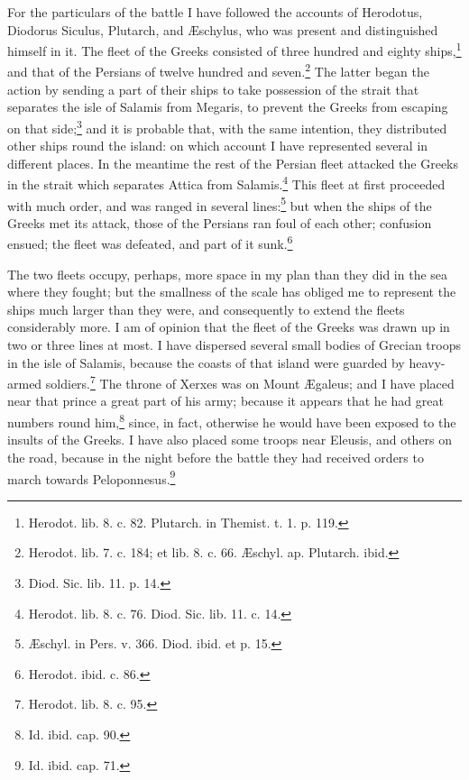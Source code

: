 \documentclass[a4paper, 11pt, oneside, polutonikogreek, english]{article}
\begin{document}
For the particulars of the battle I have followed the accounts of Herodotus, Diodorus Siculus, Plutarch, and Æschylus, who was present and distinguished himself in it. The fleet of the Greeks consisted of three hundred and eighty ships,\footnote{Herodot. lib. 8. c. 82. Plutarch. in Themist. t. 1. p. 119.} and that of the Persians of twelve hundred and seven.\footnote{Herodot. lib. 7. c. 184; et lib. 8. c. 66. Æschyl. ap. Plutarch. ibid.} The latter began the action by sending a part of their ships to take possession of the strait that separates the isle of Salamis from Megaris, to prevent the Greeks from escaping on that side;\footnote{Diod. Sic. lib. 11. p. 14.} and it is probable that, with the same intention, they distributed other ships round the island: on which account I have represented several in different places. In the meantime the rest of the Persian fleet attacked the Greeks in the strait which separates Attica from Salamis.\footnote{Herodot. lib. 8. c. 76. Diod. Sic. lib. 11. c. 14.} This fleet at first proceeded with much order, and was ranged in several lines:\footnote{Æschyl. in Pers. v. 366. Diod. ibid. et p. 15.} but when the ships of the Greeks met its attack, those of the Persians ran foul of each other; confusion ensued; the fleet was defeated, and part of it sunk.\footnote{Herodot. ibid. c. 86.}

The two fleets occupy, perhaps, more space in my plan than they did in the sea where they fought; but the smallness of the scale has obliged me to represent the ships much larger than they were, and consequently to extend the fleets considerably more. I am of opinion that the fleet of the Greeks was drawn up in two or three lines at most. I have dispersed several small bodies of Grecian troops in the isle of Salamis, because the coasts of that island were guarded by heavy-armed soldiers.\footnote{Herodot. lib. 8. c. 95.} The throne of Xerxes was on Mount Ægaleus; and I have placed near that prince a great part of his army; because it appears that he had great numbers round him,\footnote{Id. ibid. cap. 90.} since, in fact, otherwise he would have been exposed to the insults of the Greeks. I have also placed some troops near Eleusis, and others on the road, because in the night before the battle they had received orders to march towards Peloponnesus.\footnote{Id. ibid. cap. 71.}
\end{document}
